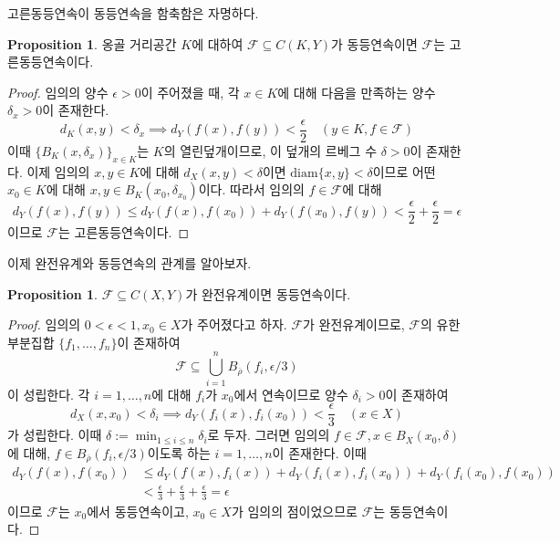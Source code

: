\documentclass[11pt]{book}
\numberwithin{equation}{chapter}
\def\eps{\epsilon}
\def\calF{\mathcal{F}}
\def\diam{\text{diam}}
\theoremstyle{definition}
\newtheorem{prop}[thm]{Proposition}
\begin{document}
고른동등연속이 동등연속을 함축함은 자명하다.

\begin{prop} \label{10.2.4}
    옹골 거리공간 \(K\)에 대하여 \(\calF \subseteq C(K, Y)\)가 동등연속이면 \(\calF\)는 고른동등연속이다.
\end{prop}
\begin{proof}
    임의의 양수 \(\eps > 0\)이 주어졌을 때, 각 \(x \in K\)에 대해 다음을 만족하는 양수 \(\delta_x > 0\)이 존재한다. 
    \[
    d_K(x, y) < \delta_x \implies d_Y(f(x), f(y)) < \frac{\eps}{2} \quad (y \in K, f \in \calF)
    \]
    이때 \(\{B_K(x, \delta_x)\}_{x \in K}\)는 \(K\)의 열린덮개이므로, 이 덮개의 르베그 수 \(\delta > 0\)이 존재한다. 이제 임의의 \(x, y \in K\)에 대해 \(d_X(x, y) < \delta\)이면 \(\diam \{x, y\} < \delta\)이므로 어떤 \(x_0 \in K\)에 대해 \(x, y \in B_K(x_0, \delta_{x_0})\)이다. 따라서 임의의 \(f \in \calF\)에 대해
    \[
    d_Y(f(x), f(y)) \le d_Y(f(x), f(x_0)) + d_Y(f(x_0), f(y)) < \frac{\eps}{2} + \frac{\eps}{2} = \eps    
    \]
    이므로 \(\calF\)는 고른동등연속이다.
\end{proof}

이제 완전유계와 동등연속의 관계를 알아보자.

\begin{prop} \label{10.2.5}
    \(\calF \subseteq C(X, Y)\)가 완전유계이면 동등연속이다.
\end{prop}
\begin{proof}
    임의의 \(0 < \eps < 1, x_0 \in X\)가 주어졌다고 하자. \(\calF\)가 완전유계이므로, \(\calF\)의 유한 부분집합 \(\{f_1, \ldots, f_n\}\)이 존재하여
    \[
    \calF \subseteq \bigcup_{i=1}^n B_{\overline{\rho}}(f_i, \eps/3)    
    \]
    이 성립한다. 각 \(i = 1, \ldots, n\)에 대해 \(f_i\)가 \(x_0\)에서 연속이므로 양수 \(\delta_i > 0\)이 존재하여
    \[
    d_X(x, x_0) < \delta_i \implies d_Y(f_i(x), f_i(x_0)) < \frac{\eps}{3} \quad (x \in X)    
    \]
    가 성립한다. 이때 \(\delta := \min_{1 \le i \le n} \delta_i\)로 두자. 그러면 임의의 \(f \in \calF, x \in B_X(x_0, \delta)\)에 대해, \(f \in B_{\overline{\rho}}(f_i, \eps/3)\)이도록 하는 \(i = 1, \ldots, n\)이 존재한다. 이때
    \begin{align*}
        d_Y(f(x), f(x_0)) &\le d_Y(f(x), f_i(x)) + d_Y(f_i(x), f_i(x_0)) + d_Y(f_i(x_0), f(x_0))\\
        &< \frac{\eps}{3} + \frac{\eps}{3} + \frac{\eps}{3} = \eps
    \end{align*}
    이므로 \(\calF\)는 \(x_0\)에서 동등연속이고, \(x_0 \in X\)가 임의의 점이었으므로 \(\calF\)는 동등연속이다.
\end{proof}
\end{document}
